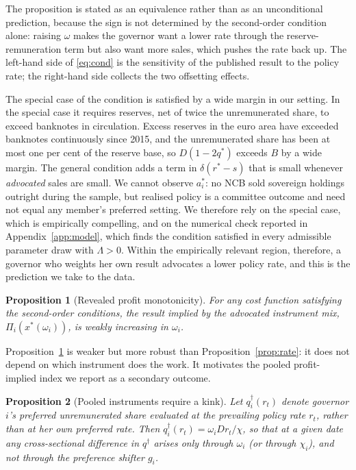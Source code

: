 \documentclass[11pt]{article}
\theoremstyle{plain}
\newtheorem{proposition}{Proposition}
\begin{document}
The proposition is stated as an equivalence rather than as an unconditional prediction, because the sign is not determined by the second-order condition alone: raising $\omega$ makes the governor want a lower rate through the reserve-remuneration term but also want more sales, which pushes the rate back up. The left-hand side of \eqref{eq:cond} is the sensitivity of the published result to the policy rate; the right-hand side collects the two offsetting effects.

The special case of the condition is satisfied by a wide margin in our setting. In the special case it requires reserves, net of twice the unremunerated share, to exceed banknotes in circulation. Excess reserves in the euro area have exceeded banknotes continuously since 2015, and the unremunerated share has been at most one per cent of the reserve base, so $D(1-2q^*)$ exceeds $B$ by a wide margin. The general condition adds a term in $\delta(r^*-s)$ that is small whenever \emph{advocated} sales are small. We cannot observe $a_i^*$: no NCB sold sovereign holdings outright during the sample, but realised policy is a committee outcome and need not equal any member's preferred setting. We therefore rely on the special case, which is empirically compelling, and on the numerical check reported in Appendix~\ref{app:model}, which finds the condition satisfied in every admissible parameter draw with $\Lambda>0$. Within the empirically relevant region, therefore, a governor who weights her own result advocates a lower policy rate, and this is the prediction we take to the data.

\begin{proposition}[Revealed profit monotonicity]\label{prop:pnl}
For any cost function satisfying the second-order conditions, the result implied by the advocated instrument mix, $\Pi_i(x^*(\omega_i))$, is weakly increasing in $\omega_i$.
\end{proposition}

Proposition~\ref{prop:pnl} is weaker but more robust than Proposition~\ref{prop:rate}: it does not depend on which instrument does the work. It motivates the pooled profit-implied index we report as a secondary outcome.

\begin{proposition}[Pooled instruments require a kink]\label{prop:kink}
Let $q_i^\dagger(r_t)$ denote governor $i$'s preferred unremunerated share evaluated at the prevailing policy rate $r_t$, rather than at her own preferred rate. Then $q_i^\dagger(r_t) = \omega_i D r_t/\chi$, so that at a given date any cross-sectional difference in $q^\dagger$ arises only through $\omega_i$ (or through $\chi_i$), and not through the preference shifter $g_i$.
\end{proposition}
\end{document}
